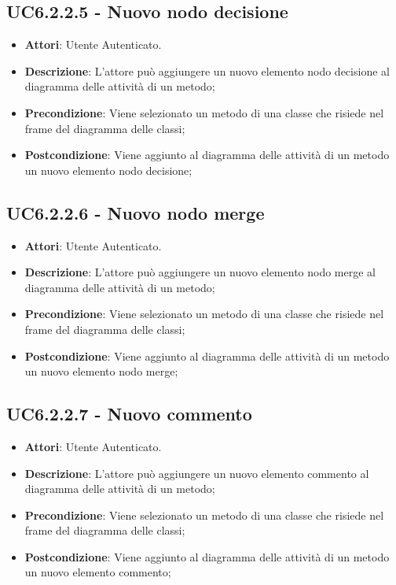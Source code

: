 \subsection{UC6.2.2.5 - Nuovo nodo decisione} 
\label{ssec:UC6.2.2.5} 
\begin{itemize} 
\item \textbf{Attori}: Utente Autenticato.
\item \textbf{Descrizione}: L'attore può aggiungere un nuovo elemento nodo decisione al diagramma delle attività di un metodo;
\item \textbf{Precondizione}: Viene selezionato un metodo di una classe che risiede nel frame del diagramma delle  classi;
\item \textbf{Postcondizione}: Viene aggiunto al diagramma delle attività di un metodo un nuovo elemento nodo decisione;
\end{itemize} 
\subsection{UC6.2.2.6 - Nuovo nodo merge} 
\label{ssec:UC6.2.2.6} 
\begin{itemize} 
\item \textbf{Attori}: Utente Autenticato.
\item \textbf{Descrizione}: L'attore può aggiungere un nuovo elemento nodo merge al diagramma delle attività di un metodo;
\item \textbf{Precondizione}: Viene selezionato un metodo di una classe che risiede nel frame del diagramma delle  classi;
\item \textbf{Postcondizione}: Viene aggiunto al diagramma delle attività di un metodo un nuovo elemento nodo merge;
\end{itemize} 
\subsection{UC6.2.2.7 - Nuovo commento} 
\label{ssec:UC6.2.2.7} 
\begin{itemize} 
\item \textbf{Attori}: Utente Autenticato.
\item \textbf{Descrizione}: L'attore può aggiungere un nuovo elemento commento al diagramma delle attività di un metodo;
\item \textbf{Precondizione}: Viene selezionato un metodo di una classe che risiede nel frame del diagramma delle  classi;
\item \textbf{Postcondizione}: Viene aggiunto al diagramma delle attività di un metodo un nuovo elemento commento;
\end{itemize} 
